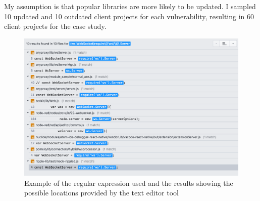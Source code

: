 \vspace{3mm}
\begin{table}[ht]
\centering
{}
\caption{Summary of the 60 Selected Client Popularity (measured by GitHub stars). \textit{Note: 30 clients (Updated) had migrated, while 30 clients (Outdated) still depend on the vulnerable dependency.}}
\label{tab:selected_project}
\end{table}

My assumption is that popular libraries are more likely to be updated.
I sampled 10 updated and 10 outdated client projects for each vulnerability, resulting in 60 client projects for the case study.

\begin{figure}[ht]
\centering
\includegraphics[trim={0 0 0 2.5cm},width=1\textwidth]{images/UU_ws.png}
\caption{Example of the regular expression used and the results showing the possible locations provided by the text editor tool}
\label{fig:regExp}
\end{figure}

